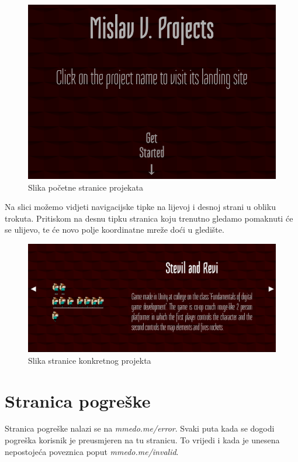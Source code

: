 \documentclass[times, utf8, zavrsni, numeric]{fer}
\begin{document}
\begin{figure}[htb]
				\centering
				\includegraphics[width=14.6cm]{images/projects-main.png}
				\caption{Slika početne stranice projekata}
				\label{fig:projects-main}
\end{figure}

\pagebreak
\qquad Na slici možemo vidjeti navigacijske tipke na lijevoj i desnoj strani u obliku trokuta.
Pritiskom na desnu tipku stranica koju trenutno gledamo pomaknuti će se ulijevo, te će novo polje koordinatne mreže doći u gledište.

\begin{figure}[htb]
				\centering
				\includegraphics[width=14.6cm]{images/projects-img-text.png}
				\caption{Slika stranice konkretnog projekta}
				\label{fig:projects-img-text}
\end{figure}

\section{Stranica pogreške}
\qquad Stranica pogreške nalazi se na \textit{mmedo.me/error}.
Svaki puta kada se dogodi pogreška korisnik je preusmjeren na tu stranicu.
To vrijedi i kada je unesena nepostojeća poveznica poput \textit{mmedo.me/invalid}.
\end{document}
